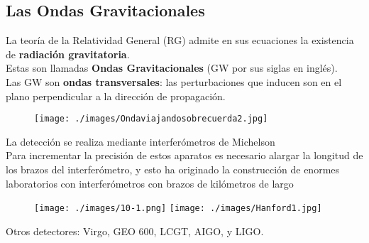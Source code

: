 \documentclass[10pt]{beamer}
\begin{document}
\subsection{Las Ondas Gravitacionales}
\begin{frame}
La teor\'{i}a de la Relatividad General (RG) admite en sus ecuaciones la existencia de \textbf{radiaci\'on gravitatoria}.\\ 
\bigskip
Estas son llamadas \textbf{Ondas Gravitacionales} (GW por sus siglas en ingl\'es).\\ 
Las GW son \textbf{ondas transversales}: las perturbaciones que inducen son en el plano perpendicular a la
direcci\'on de propagaci\'on.\\ \pause
\begin{figure}
 \centering
\begin{center}
 \texttt{[image: ./images/Ondaviajandosobrecuerda2.jpg]}
\end{center}

\end{figure}
\end{frame}
\begin{frame}
La detecci\'on se realiza mediante interfer\'ometros de Michelson\\ \pause 
Para incrementar la precisi\'on de estos aparatos es necesario alargar la longitud de los brazos del interfer\'ometro, y esto ha 
originado la construcci\'on de enormes laboratorios con interfer\'ometros con brazos de kil\'ometros de largo
\begin{figure}[H]  %
   \centering
    \texttt{[image: ./images/10-1.png]}
 \texttt{[image: ./images/Hanford1.jpg]}
  \end{figure}\pause
 Otros detectores: Virgo, GEO 600, LCGT, AIGO, y LIGO.
\end{frame}
\end{document}
